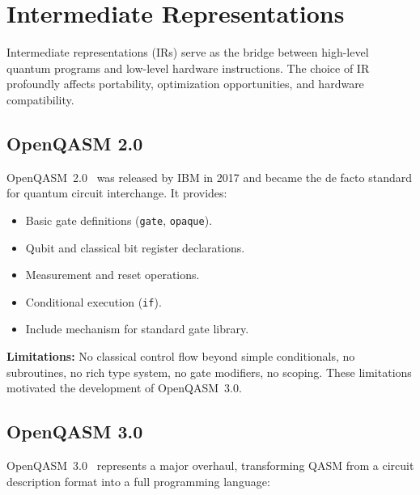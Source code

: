 \documentclass[journal]{IEEEtran}
\begin{document}
\section{Intermediate Representations}
\label{sec:irs}

Intermediate representations (IRs) serve as the bridge between high-level quantum programs and low-level hardware instructions. The choice of IR profoundly affects portability, optimization opportunities, and hardware compatibility.

\subsection{OpenQASM 2.0}

OpenQASM~2.0~\cite{cross2017open} was released by IBM in 2017 and became the de facto standard for quantum circuit interchange. It provides:
\begin{itemize}
    \item Basic gate definitions (\texttt{gate}, \texttt{opaque}).
    \item Qubit and classical bit register declarations.
    \item Measurement and reset operations.
    \item Conditional execution (\texttt{if}).
    \item Include mechanism for standard gate library.
\end{itemize}

\textbf{Limitations:} No classical control flow beyond simple conditionals, no subroutines, no rich type system, no gate modifiers, no scoping. These limitations motivated the development of OpenQASM~3.0.

\subsection{OpenQASM 3.0}

OpenQASM~3.0~\cite{cross2022openqasm} represents a major overhaul, transforming QASM from a circuit description format into a full programming language:
\end{document}
